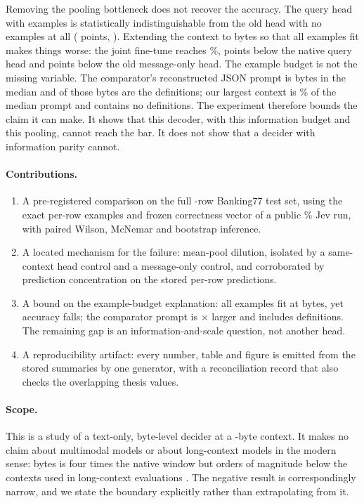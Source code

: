 \documentclass[11pt]{article}
\begin{document}
Removing the pooling bottleneck does not recover the accuracy. The query head
with examples is statistically indistinguishable from the old head with no
examples at all (\PQueryVsOldZero{} points, \PQueryVsOldZeroPText). Extending
the context to \PSeq{} bytes so that all \PExamples{} examples fit makes things
worse: the joint fine-tune reaches \PLenTwoAcc\%, \PLenVsNative{} points below
the native query head and \PLenVsOldZero{} points below the old message-only
head. The example budget is not the missing variable. The comparator's
reconstructed JSON prompt is \PJevPromptMedian{} bytes in the median and
\PJevDefsBytes{} of those bytes are the \PLabels{} definitions; our largest
context is \PAzuriteShare\% of the median prompt and contains no definitions.
The experiment therefore bounds the claim it can make. It shows that this
decoder, with this information budget and this pooling, cannot reach the bar.
It does not show that a decider with information parity cannot.

\paragraph{Contributions.}
\begin{enumerate}
  \item A pre-registered comparison on the full \PN-row Banking77 test set,
  using the exact per-row examples and frozen correctness vector of a public
  \PJevAcc\% Jev run, with paired Wilson, McNemar and bootstrap inference.
  \item A located mechanism for the failure: mean-pool dilution, isolated by a
  same-context head control and a message-only control, and corroborated by
  prediction concentration on the stored per-row predictions.
  \item A bound on the example-budget explanation: all \PExamples{} examples fit
  at \PSeq{} bytes, yet accuracy falls; the comparator prompt is
  \PJevPromptRatio$\times$ larger and includes definitions. The remaining gap is
  an information-and-scale question, not another head.
  \item A reproducibility artifact: every number, table and figure is emitted
  from the stored summaries by one generator, with a reconciliation record that
  also checks the overlapping thesis values.
\end{enumerate}

\paragraph{Scope.}
This is a study of a text-only, byte-level decider at a \PSeq-byte context. It
makes no claim about multimodal models or about long-context models in the
modern sense: \PSeq{} bytes is four times the native window but orders of
magnitude below the contexts used in long-context evaluations
\citep{liu2023lost,hsieh2024ruler}. The negative result is correspondingly
narrow, and we state the boundary explicitly rather than extrapolating from it.
\end{document}
